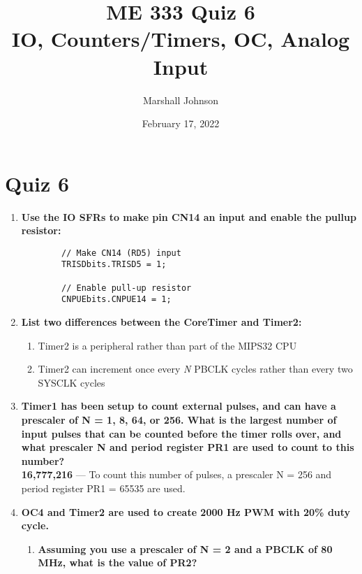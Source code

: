 \documentclass{article}
\title{ME 333 Quiz 6 \\ [1ex] \large IO, Counters/Timers, OC, Analog Input}
\author{Marshall Johnson}
\date{February 17, 2022}
\begin{document}
\maketitle

\section*{Quiz 6}

\begin{enumerate}[label=\textbf{\arabic*})]
    \item \textbf{Use the IO SFRs to make pin CN14 an input and enable the pullup resistor:} \\
    
    \begin{lstlisting}
        // Make CN14 (RD5) input
        TRISDbits.TRISD5 = 1;

        // Enable pull-up resistor
        CNPUEbits.CNPUE14 = 1;
    \end{lstlisting}

    \item \textbf{List two differences between the CoreTimer and Timer2:} \\
        \begin{enumerate}
            \item Timer2 is a peripheral rather than part of the MIPS32 CPU
            \item Timer2 can increment once every \textit{N} PBCLK cycles rather than
            every two SYSCLK cycles
        \end{enumerate}

    \item \textbf{Timer1 has been setup to count external pulses, and can have a prescaler of N = 1, 8, 64, or 
    256. What is the largest number of input pulses that can be counted before the timer rolls over, 
    and what prescaler N and period register PR1 are used to count to this number?} \\

    \textbf{16,777,216} --- To count this number of pulses, a prescaler N = 256 and period register PR1 = 65535 are used.

    \item \textbf{OC4 and Timer2 are used to create 2000 Hz PWM with 20\% duty cycle.} \\
    
    \begin{enumerate}[label=\textbf{\alph*}.]
        \item \textbf{Assuming you use a prescaler of N = 2 and a PBCLK of 80 MHz, what is the value of 
        PR2?} \\


\end{enumerate}
\end{enumerate}
\end{document}
